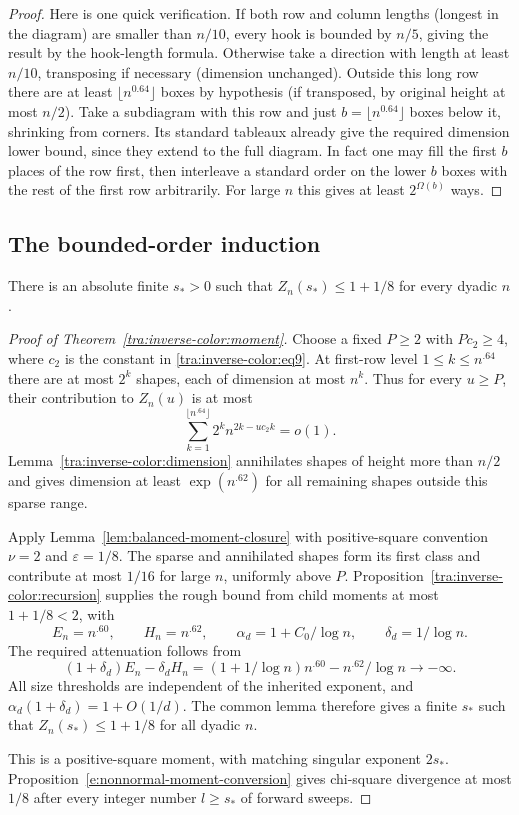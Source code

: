 \begin{proof}\label{tra:inverse-color:dimension-proof}
\label{tra:inverse-color:dimension-proof-details}
Here is one quick verification. If both row and column lengths (longest in the diagram) are smaller than \(n/10\), every hook is bounded by \(n/5\), giving the result by the hook-length formula. Otherwise take a direction with length at least \(n/10\), transposing if necessary (dimension unchanged). Outside this long row there are at least \(\lfloor n^{0.64}\rfloor\) boxes by hypothesis (if transposed, by original height at most \(n/2\)). Take a subdiagram with this row and just \(b=\lfloor n^{0.64}\rfloor\) boxes below it, shrinking from corners. Its standard tableaux already give the required dimension lower bound, since they extend to the full diagram. In fact one may fill the first \(b\) places of the row first, then interleave a standard order on the lower \(b\) boxes with the rest of the first row arbitrarily. For large \(n\) this gives at least \(2^{\Omega(b)}\) ways.
\end{proof}
\subsection{The bounded-order induction}
\begin{theorem}\label{tra:inverse-color:moment}
There is an absolute finite $s_*>0$ such that $Z_n(s_*)\le1+1/8$ for every dyadic $n$. 
\end{theorem}
\begin{proof}[Proof of Theorem~\ref{tra:inverse-color:moment}]
\label{tra:inverse-color:bounded-order-induction-and-completion}
Choose a fixed $P\ge2$ with $Pc_2\ge4$, where $c_2$ is the
constant in \eqref{tra:inverse-color:eq9}. At first-row level
$1\le k\le n^{.64}$ there are at most $2^k$ shapes, each of dimension
at most $n^k$. Thus for every $u\ge P$, their contribution to $Z_n(u)$
is at most
\[
 \sum_{k=1}^{\lfloor n^{.64}\rfloor}
       2^k n^{2k-u c_2k}=o(1).
\]
Lemma~\ref{tra:inverse-color:dimension} annihilates shapes of height
more than $n/2$ and gives dimension at least $\exp(n^{.62})$ for all
remaining shapes outside this sparse range.

Apply Lemma~\ref{lem:balanced-moment-closure} with positive-square
convention $\nu=2$ and $\varepsilon=1/8$. The sparse and annihilated
shapes form its first class and contribute at most $1/16$ for large
$n$, uniformly above $P$. Proposition~\ref{tra:inverse-color:recursion}
supplies the rough bound from child moments at most $1+1/8<2$, with
\[
 E_n=n^{.60},\qquad H_n=n^{.62},\qquad
 \alpha_d=1+C_0/\log n,\qquad\delta_d=1/\log n.
\]
The required attenuation follows from
\[
 (1+\delta_d)E_n-\delta_dH_n
 =(1+1/\log n)n^{.60}-n^{.62}/\log n\longrightarrow-\infty.
\]
All size thresholds are independent of the inherited exponent, and
$\alpha_d(1+\delta_d)=1+O(1/d)$. The common lemma therefore gives a
finite $s_*$ such that $Z_n(s_*)\le1+1/8$ for all dyadic $n$.

This is a positive-square moment, with matching singular exponent
$2s_*$. Proposition~\ref{e:nonnormal-moment-conversion} gives
chi-square divergence at most $1/8$ after every integer number
$l\ge s_*$ of forward sweeps.
\end{proof}
